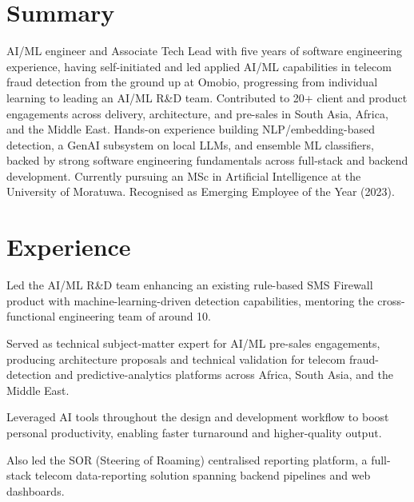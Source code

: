 \documentclass[10.5pt]{article}
\begin{document}

\section*{Summary}
AI/ML engineer and Associate Tech Lead with five years of software engineering experience, having self-initiated and led applied AI/ML capabilities in telecom fraud detection from the ground up at Omobio, progressing from individual learning to leading an AI/ML R\&D team. Contributed to 20+ client and product engagements across delivery, architecture, and pre-sales in South Asia, Africa, and the Middle East. Hands-on experience building NLP/embedding-based detection, a GenAI subsystem on local LLMs, and ensemble ML classifiers, backed by strong software engineering fundamentals across full-stack and backend development. Currently pursuing an MSc in Artificial Intelligence at the University of Moratuwa. Recognised as Emerging Employee of the Year (2023).

\section*{Experience}

\begin{cvitems}
  \item Led the AI/ML R\&D team enhancing an existing rule-based SMS Firewall product with machine-learning-driven detection capabilities, mentoring the cross-functional engineering team of around 10.
  \item Served as technical subject-matter expert for AI/ML pre-sales engagements, producing architecture proposals and technical validation for telecom fraud-detection and predictive-analytics platforms across Africa, South Asia, and the Middle East.
  \item Leveraged AI tools throughout the design and development workflow to boost personal productivity, enabling faster turnaround and higher-quality output.
  \item Also led the SOR (Steering of Roaming) centralised reporting platform, a full-stack telecom data-reporting solution spanning backend pipelines and web dashboards.
\end{cvitems}
\end{document}
